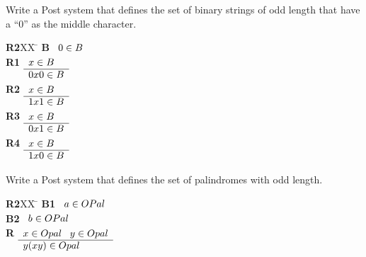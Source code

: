 \documentclass[]{exam}
\theoremstyle{definition}
\begin{document}
\begin{questions}
\question Write a Post system that defines the set of binary strings of odd
length that have a ``0'' as the middle character.
\begin{solution}
\begin{tabbing}
{\bf R2}XX \=  \kill
{\bf B} \>
        \(\begin{array}[t]{l}
        0\in B
        \end{array}\) \\[2ex]
{\bf R1} \>
        \(\begin{array}[t]{l}
        x \in B \\
        \hline
        0x0 \in B
        \end{array}\) \\[2ex]
{\bf R2} \>
        \(\begin{array}[t]{l}
        x \in B \\
        \hline
        1x1 \in B
        \end{array}\) \\[2ex]
{\bf R3} \>
        \(\begin{array}[t]{l}
        x \in B \\
        \hline
        0x1 \in B
        \end{array}\) \\[2ex]
{\bf R4} \>
        \(\begin{array}[t]{l}
        x \in B \\
        \hline
        1x0 \in B
        \end{array}\)
\end{tabbing}

\end{solution}


\question Write a Post system that defines the set of palindromes with odd
length.
\begin{solution}
\begin{tabbing}
{\bf R2}XX \=  \kill
{\bf B1} \>
        \(\begin{array}[t]{l}
        a \in OPal
        \end{array}\) \\[2ex]
{\bf B2} \>
        \(\begin{array}[t]{l}
        b \in OPal 
        \end{array}\) \\[2ex]
{\bf R} \>
        \(\begin{array}[t]{l}
        x \in Opal \;\;\;y \in Opal \\
        \hline
        y(xy) \in Opal
        \end{array}\)
\end{tabbing}
\end{solution}


\end{questions}
\end{document}
